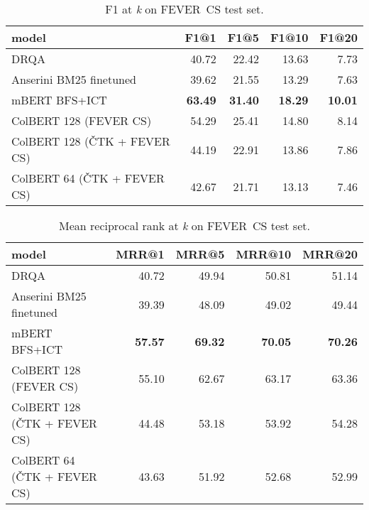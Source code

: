 \begin{table}[H] \label{table:fever-f1}
    \centering
    \begin{tabular}{lrrrr}
    \toprule
                            model &   F1@1 &   F1@5 &  F1@10 &  F1@20 \\
    \midrule
                             DRQA &  40.72 &  22.42 &  13.63 &   7.73 \\
          Anserini BM25 finetuned &  39.62 &  21.55 &  13.29 &   7.63 \\
                    mBERT BFS+ICT &  \textbf{63.49} &  \textbf{31.40} &  \textbf{18.29} &  \textbf{10.01} \\
           ColBERT 128 (FEVER CS) &  54.29 &  25.41 &  14.80 &   8.14 \\
     ColBERT 128 (ČTK + FEVER CS) &  44.19 &  22.91 &  13.86 &   7.86 \\
      ColBERT 64 (ČTK + FEVER CS) &  42.67 &  21.71 &  13.13 &   7.46 \\
    \bottomrule
    \end{tabular}
    \caption{F1 at \emph{k} on FEVER~CS test set.}
\end{table}

\begin{table}[H] \label{table:fever-mrr}
    \centering
    \begin{tabular}{lrrrr}
    \toprule
                            model &  MRR@1 &  MRR@5 &  MRR@10 &  MRR@20 \\
    \midrule
                             DRQA &  40.72 &  49.94 &   50.81 &   51.14 \\
          Anserini BM25 finetuned &  39.39 &  48.09 &   49.02 &   49.44 \\
                    mBERT BFS+ICT &  \textbf{57.57} &  \textbf{69.32} &   \textbf{70.05} &   \textbf{70.26} \\
           ColBERT 128 (FEVER CS) &  55.10 &  62.67 &   63.17 &   63.36 \\
     ColBERT 128 (ČTK + FEVER CS) &  44.48 &  53.18 &   53.92 &   54.28 \\
      ColBERT 64 (ČTK + FEVER CS) &  43.63 &  51.92 &   52.68 &   52.99 \\
    \bottomrule
    \end{tabular}
    \caption{Mean reciprocal rank at \emph{k} on FEVER~CS test set.}
\end{table}

